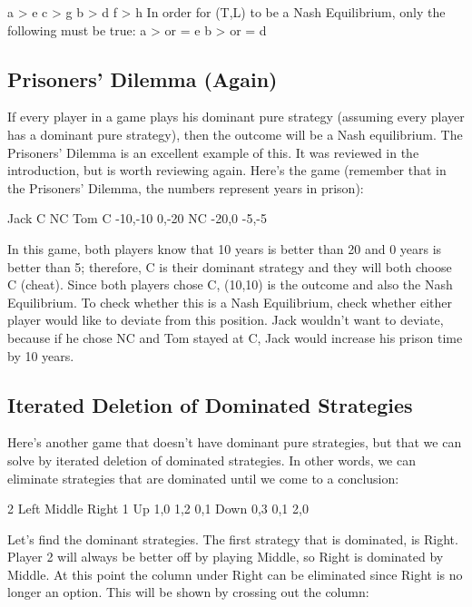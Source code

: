 \documentclass[a4paper,12pt]{article}
\begin{document}
a > e
c > g
b > d
f > h
In order for (T,L) to be a Nash Equilibrium, only the following must be true:
a > or = e
b > or = d
\subsection{Prisoners' Dilemma (Again)}

If every player in a game plays his dominant pure strategy (assuming every player has a dominant pure strategy), then the outcome will be a Nash equilibrium. The Prisoners' Dilemma is an excellent example of this. It was reviewed in the introduction, but is worth reviewing again. Here's the game (remember that in the Prisoners' Dilemma, the numbers represent years in prison):

Jack
C	NC
Tom	C	-10,-10	0,-20
NC	-20,0	-5,-5

In this game, both players know that 10 years is better than 20 and 0 years is better than 5; therefore, C is their dominant strategy and they will both choose C (cheat). Since both players chose C, (10,10) is the outcome and also the Nash Equilibrium. To check whether this is a Nash Equilibrium, check whether either player would like to deviate from this position. Jack wouldn't want to deviate, because if he chose NC and Tom stayed at C, Jack would increase his prison time by 10 years.

\subsection{Iterated Deletion of Dominated Strategies}

Here's another game that doesn't have dominant pure strategies, but that we can solve by iterated deletion of dominated strategies. In other words, we can eliminate strategies that are dominated until we come to a conclusion:

2
Left	Middle	Right
1	Up	1,0	1,2	0,1
Down	0,3	0,1	2,0

Let's find the dominant strategies. The first strategy that is dominated, is Right. Player 2 will always be better off by playing Middle, so Right is dominated by Middle. At this point the column under Right can be eliminated since Right is no longer an option. This will be shown by crossing out the column:
\end{document}
